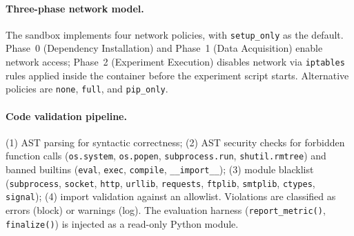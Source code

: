 \documentclass{llmxive}
\begin{document}
\paragraph{Three-phase network model.} The sandbox implements four network policies, with \texttt{setup\_only} as the default. Phase~0 (Dependency Installation) and Phase~1 (Data Acquisition) enable network access; Phase~2 (Experiment Execution) disables network via \texttt{iptables} rules applied inside the container before the experiment script starts. Alternative policies are \texttt{none}, \texttt{full}, and \texttt{pip\_only}.

\paragraph{Code validation pipeline.} (1) AST parsing for syntactic correctness; (2) AST security checks for forbidden function calls (\texttt{os.system}, \texttt{os.popen}, \texttt{subprocess.run}, \texttt{shutil.rmtree}) and banned builtins (\texttt{eval}, \texttt{exec}, \texttt{compile}, \texttt{\_\_import\_\_}); (3) module blacklist (\texttt{subprocess}, \texttt{socket}, \texttt{http}, \texttt{urllib}, \texttt{requests}, \texttt{ftplib}, \texttt{smtplib}, \texttt{ctypes}, \texttt{signal}); (4) import validation against an allowlist. Violations are classified as errors (block) or warnings (log). The evaluation harness (\texttt{report\_metric()}, \texttt{finalize()}) is injected as a read-only Python module.


\end{document}
